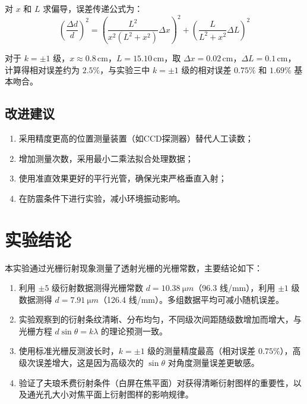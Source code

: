 \documentclass[12pt, a4paper]{article}
\begin{document}
对 $x$ 和 $L$ 求偏导，误差传递公式为：
\begin{equation}
\left(\frac{\Delta d}{d}\right)^2 = \left(\frac{L^2}{x^2(L^2+x^2)}\Delta x\right)^2 + \left(\frac{L}{L^2+x^2}\Delta L\right)^2
\end{equation}

对于 $k = \pm 1$ 级，$x \approx 0.8\,\text{cm}$，$L = 15.10\,\text{cm}$，取 $\Delta x = 0.02\,\text{cm}$，$\Delta L = 0.1\,\text{cm}$，计算得相对误差约为 $2.5\%$，与实验三中 $k = \pm 1$ 级的相对误差 $0.75\%$ 和 $1.69\%$ 基本吻合。

\subsection{改进建议}

\begin{enumerate}
  \item 采用精度更高的位置测量装置（如CCD探测器）替代人工读数；
  \item 增加测量次数，采用最小二乘法拟合处理数据；
  \item 使用准直效果更好的平行光管，确保光束严格垂直入射；
  \item 在防震条件下进行实验，减小环境振动影响。
\end{enumerate}

\section{实验结论}

本实验通过光栅衍射现象测量了透射光栅的光栅常数，主要结论如下：

\begin{enumerate}
  \item 利用 $\pm 5$ 级衍射数据测得光栅常数 $d = \SI{10.38}{\micro m}$（96.3 线/mm），利用 $\pm 1$ 级数据测得 $d = \SI{7.91}{\micro m}$（126.4 线/mm）。多组数据平均可减小随机误差。
  
  \item 实验观察到的衍射条纹清晰、分布均匀，不同级次间距随级数增加而增大，与光栅方程 $d\sin\theta = k\lambda$ 的理论预测一致。
  
  \item 使用标准光栅反测波长时，$k = \pm 1$ 级的测量精度最高（相对误差 $0.75\%$），高级次误差增大，这是因为高级次的 $\sin\theta$ 对角度测量误差更敏感。
  
  \item 验证了夫琅禾费衍射条件（白屏在焦平面）对获得清晰衍射图样的重要性，以及通光孔大小对焦平面上衍射图样的影响规律。
\end{enumerate}
\end{document}
